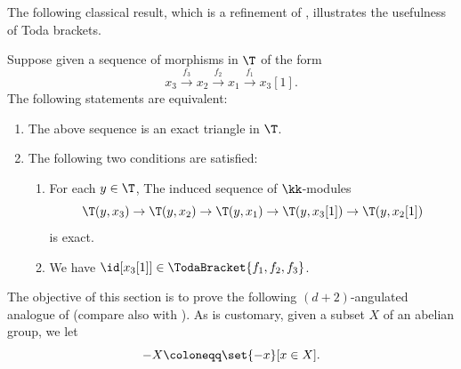 \documentclass[a4paper]{amsart}
\begin{document}
The following classical result, which is a refinement of ,
illustrates the usefulness of Toda brackets.

\begin{theorem}
  \label{thm:TodaBracket_3-angles}
  Suppose given a sequence of morphisms in $\T$ of the form
  \[
    x_3\xrightarrow{f_3}x_2\xrightarrow{f_2}x_1\xrightarrow{f_1}x_3[1].
  \]
  The following statements are equivalent:
  \begin{enumerate}
  \item The above sequence is an exact triangle in $\T$.
  \item The following two conditions are satisfied:
    \begin{enumerate}
    \item For each $y\in\T$, The induced sequence of $\kk$-modules
      \[
        \T(y,x_3)\to\T(y,x_2)\to\T(y,x_1)\to\T(y,x_3[1])\to\T(y,x_2[1])
      \]
      is exact.
    \item We have $\id[x_3[1]]\in\TodaBracket{f_1,f_2,f_3}$.
    \end{enumerate}
  \end{enumerate}
\end{theorem}

The objective of this section is to prove the following $(d+2)$-angulated
analogue of  (compare also with
). As is customary, given a subset $X$ of an abelian
group, we let
\[
  -X\coloneqq\set{-x}[x\in X].
\]
\end{document}

